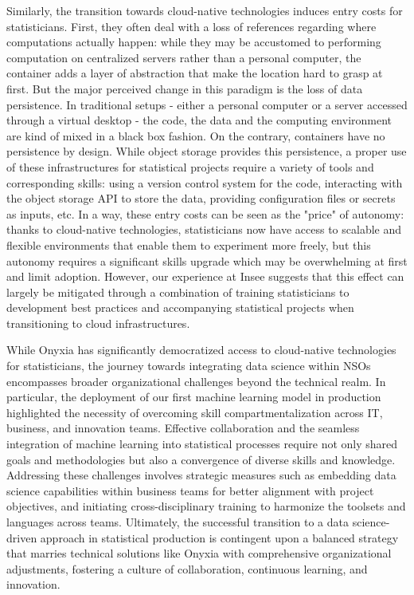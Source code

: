 Similarly, the transition towards cloud-native technologies induces entry costs for statisticians. First, they often deal with a loss of references regarding where computations actually happen: while they may be accustomed to performing computation on centralized servers rather than a personal computer, the container adds a layer of abstraction that make the location hard to grasp at first. But the major perceived change in this paradigm is the loss of data persistence. In traditional setups - either a personal computer or a server accessed through a virtual desktop - the code, the data and the computing environment are kind of mixed in a black box fashion. On the contrary, containers have no persistence by design. While object storage provides this persistence, a proper use of these infrastructures for statistical projects require a variety of tools and corresponding skills: using a version control system for the code, interacting with the object storage API to store the data, providing configuration files or secrets as inputs, etc. In a way, these entry costs can be seen as the "price" of autonomy: thanks to cloud-native technologies, statisticians now have access to scalable and flexible environments that enable them to experiment more freely, but this autonomy requires a significant skills upgrade which may be overwhelming at first and limit adoption. However, our experience at Insee suggests that this effect can largely be mitigated through a combination of training statisticians to development best practices and accompanying statistical projects when transitioning to cloud infrastructures.

While Onyxia has significantly democratized access to cloud-native technologies for statisticians, the journey towards integrating data science within NSOs encompasses broader organizational challenges beyond the technical realm. In particular, the deployment of our first machine learning model in production highlighted the necessity of overcoming skill compartmentalization across IT, business, and innovation teams. Effective collaboration and the seamless integration of machine learning into statistical processes require not only shared goals and methodologies but also a convergence of diverse skills and knowledge. Addressing these challenges involves strategic measures such as embedding data science capabilities within business teams for better alignment with project objectives, and initiating cross-disciplinary training to harmonize the toolsets and languages across teams. Ultimately, the successful transition to a data science-driven approach in statistical production is contingent upon a balanced strategy that marries technical solutions like Onyxia with comprehensive organizational adjustments, fostering a culture of collaboration, continuous learning, and innovation.

